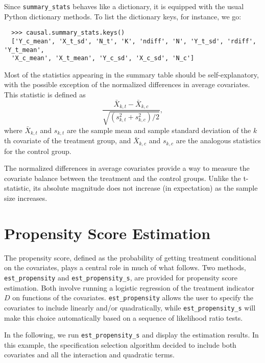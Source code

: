 \documentclass[12pt]{article}
\theoremstyle{definition}
\theoremstyle{definition}
\theoremstyle{definition}
\theoremstyle{remark}
\begin{document}
Since \texttt{summary\_stats} behaves like a dictionary, it is equipped with the usual Python dictionary methods. To list the dictionary keys, for instance, we go:
\begin{verbatim}
  >>> causal.summary_stats.keys()
  ['Y_c_mean', 'X_t_sd', 'N_t', 'K', 'ndiff', 'N', 'Y_t_sd', 'rdiff', 'Y_t_mean',
  'X_c_mean', 'X_t_mean', 'Y_c_sd', 'X_c_sd', 'N_c']
\end{verbatim}

Most of the statistics appearing in the summary table should be self-explanatory, with the possible exception of the normalized differences in average covariates. This statistic is defined as
\[\frac{\bar{X}_{k,t} - \bar{X}_{k,c}}{\sqrt{\left(s^2_{k,t}+s^2_{k,c}\right)\Big/ 2}},\]
where $\bar{X}_{k,t}$ and $s_{k,t}$ are the sample mean and sample standard deviation of the $k$th covariate of the treatment group, and $\bar{X}_{k,c}$ and $s_{k,c}$ are the analogous statistics for the control group.

The normalized differences in average covariates provide a way to measure the covariate balance between the treatment and the control groups. Unlike the t-statistic, its absolute magnitude does not increase (in expectation) as the sample size increases.

\section*{Propensity Score Estimation}

The propensity score, defined as the probability of getting treatment conditional on the covariates, plays a central role in much of what follows. Two methods, \texttt{est\_propensity} and \texttt{est\_propensity\_s}, are provided for propensity score estimation. Both involve running a logistic regression of the treatment indicator $D$ on functions of the covariates. \texttt{est\_propensity} allows the user to specify the covariates to include linearly and/or quadratically, while \texttt{est\_propensity\_s} will make this choice automatically based on a sequence of likelihood ratio tests.

In the following, we run \texttt{est\_propensity\_s} and display the estimation results. In this example, the specification selection algorithm decided to include both covariates and all the interaction and quadratic terms.
\end{document}
